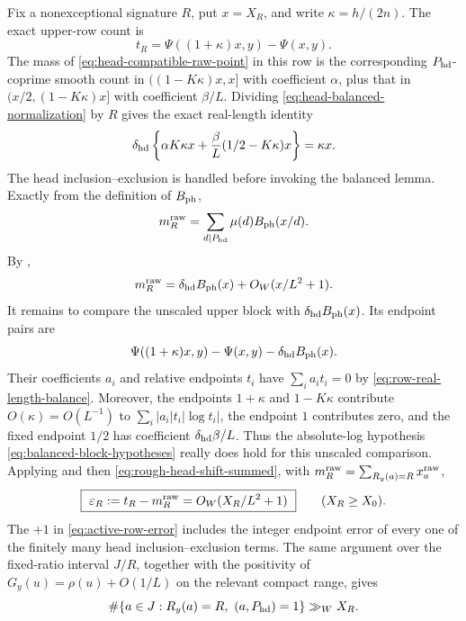 \documentclass[11pt]{article}
\numberwithin{equation}{section}
\theoremstyle{definition}
\theoremstyle{remark}
\newcommand{\1}{\mathbf 1}
\begin{document}
Fix a nonexceptional signature \(R\), put \(x=X_R\), and write
\(\kappa=h/(2n)\).  The exact upper-row count is
\[
 t_R=\Psi((1+\kappa)x,y)-\Psi(x,y).
\]
The mass of \eqref{eq:head-compatible-raw-point} in this row is the
corresponding \(P_{\rm hd}\)-coprime smooth count in
\(((1-K\kappa)x,x]\) with coefficient \(\alpha\), plus that in
\((x/2,(1-K\kappa)x]\) with coefficient \(\beta/L\).  Dividing
\eqref{eq:head-balanced-normalization} by \(R\) gives the exact real-length
identity
\begin{equation}
 \delta_{\rm hd}\left\{\alpha K\kappa x
   +\frac\beta L(1/2-K\kappa)x\right\}=\kappa x.
 \label{eq:row-real-length-balance}
\end{equation}
The head inclusion--exclusion is handled before invoking the balanced
lemma.  Exactly from the definition of \(B_{\rm ph}\),
\[
 m_R^{\rm raw}
 =\sum_{d\mid P_{\rm hd}}\mu(d)B_{\rm ph}(x/d).
\]
By ,
\begin{equation}
 m_R^{\rm raw}=\delta_{\rm hd}B_{\rm ph}(x)
                   +O_W(x/L^2+1).
 \label{eq:rough-head-shift-summed}
\end{equation}
It remains to compare the unscaled upper block with
\(\delta_{\rm hd}B_{\rm ph}(x)\).  Its endpoint pairs are
\[
 \Psi((1+\kappa)x,y)-\Psi(x,y)-\delta_{\rm hd}B_{\rm ph}(x).
\]
Their coefficients \(a_i\) and relative endpoints \(t_i\) have
\(\sum_i a_it_i=0\) by \eqref{eq:row-real-length-balance}.  Moreover,
the endpoints \(1+\kappa\) and \(1-K\kappa\) contribute
\(O(\kappa)=O(L^{-1})\) to
\(\sum_i|a_i|t_i|\log t_i|\), the endpoint \(1\) contributes zero,
and the fixed endpoint \(1/2\) has coefficient
\(\delta_{\rm hd}\beta/L\).  Thus the absolute-log hypothesis
\eqref{eq:balanced-block-hypotheses} really does hold for this unscaled
comparison.  Applying  and then
\eqref{eq:rough-head-shift-summed}, with
\(m_R^{\rm raw}=\sum_{R_y(a)=R}x_a^{\rm raw}\),
\begin{equation}
 \boxed{\ \varepsilon_R:=t_R-m_R^{\rm raw}
      =O_W(X_R/L^2+1)\ }
 \qquad(X_R\ge X_0).
 \label{eq:active-row-error}
\end{equation}
The \(+1\) in \eqref{eq:active-row-error} includes the integer endpoint
error of every one of the finitely many head inclusion--exclusion terms.
The same argument over the fixed-ratio interval \(J/R\), together with
the positivity of \(G_y(u)=\rho(u)+O(1/L)\) on the relevant compact
range, gives
\begin{equation}
 \#\{a\in J:R_y(a)=R,\ (a,P_{\rm hd})=1\}\gg_W X_R.
 \label{eq:active-clean-pool}
\end{equation}
\end{document}
